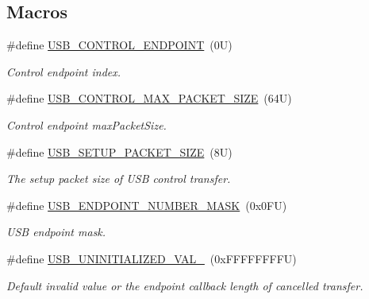 \subsection*{Macros}
\begin{DoxyCompactItemize}
\item 
\#define \hyperlink{group__usb__device__driver_gac35db57970e61e674baba9eb53aa7a8c}{U\-S\-B\-\_\-\-C\-O\-N\-T\-R\-O\-L\-\_\-\-E\-N\-D\-P\-O\-I\-N\-T}~(0\-U)
\begin{DoxyCompactList}\small\item\em Control endpoint index. \end{DoxyCompactList}\item 
\#define \hyperlink{group__usb__device__driver_ga206afe1513d3b4fdc64a7064249cb447}{U\-S\-B\-\_\-\-C\-O\-N\-T\-R\-O\-L\-\_\-\-M\-A\-X\-\_\-\-P\-A\-C\-K\-E\-T\-\_\-\-S\-I\-Z\-E}~(64\-U)
\begin{DoxyCompactList}\small\item\em Control endpoint max\-Packet\-Size. \end{DoxyCompactList}\item 
\#define \hyperlink{group__usb__device__driver_gabf1be648722b01577b84e52e1fb3d8f8}{U\-S\-B\-\_\-\-S\-E\-T\-U\-P\-\_\-\-P\-A\-C\-K\-E\-T\-\_\-\-S\-I\-Z\-E}~(8\-U)
\begin{DoxyCompactList}\small\item\em The setup packet size of U\-S\-B control transfer. \end{DoxyCompactList}\item 
\#define \hyperlink{group__usb__device__driver_ga435416dd71e258cfd83be50a991db726}{U\-S\-B\-\_\-\-E\-N\-D\-P\-O\-I\-N\-T\-\_\-\-N\-U\-M\-B\-E\-R\-\_\-\-M\-A\-S\-K}~(0x0\-F\-U)
\begin{DoxyCompactList}\small\item\em U\-S\-B endpoint mask. \end{DoxyCompactList}\item 
\#define \hyperlink{group__usb__device__driver_ga89fb39ed32e04cdb444d6d06831f1d48}{U\-S\-B\-\_\-\-U\-N\-I\-N\-I\-T\-I\-A\-L\-I\-Z\-E\-D\-\_\-\-V\-A\-L\-\_}~(0x\-F\-F\-F\-F\-F\-F\-F\-F\-U)
\begin{DoxyCompactList}\small\item\em Default invalid value or the endpoint callback length of cancelled transfer. \end{DoxyCompactList}\end{DoxyCompactItemize}
